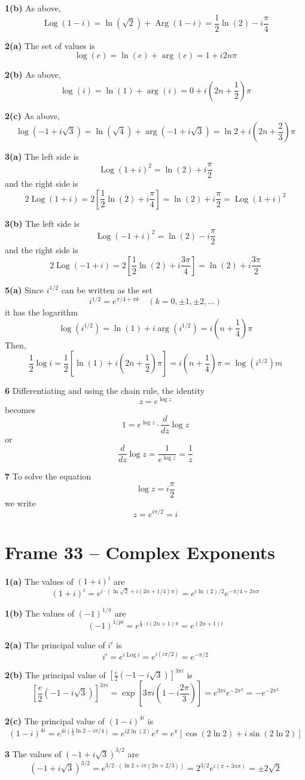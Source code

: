 \documentclass{article}
\DeclareMathOperator{\Log}{Log}
\DeclareMathOperator{\Arg}{Arg}
\begin{document}
\textbf{1(b)}
As above,
\[
	\Log(1 - i) = \ln(\sqrt{2}) + \Arg(1 - i)
	= \frac{1}{2}\ln(2) - i\frac{\pi}{4}
\]

\textbf{2(a)}
The set of values is
\[
	\log(e) = \ln(e) + \arg(e) 
	= 1 + i2n\pi
\]

\textbf{2(b)}
As above,
\[
	\log(i) = \ln(1) + \arg(i)
	= 0 + i\left(2n + \frac{1}{2}\right) \pi
\]

\textbf{2(c)}
As above,
\[
	\log(-1 + i\sqrt{3}) = \ln(\sqrt{4}) + \arg(-1 + i\sqrt{3})
	= \ln 2 + i\left(2n + \frac{2}{3}\right) \pi
\]

\textbf{3(a)}
The left side is
\[
	\Log(1 + i)^2 = \ln(2) + i \frac{\pi}{2}
\]
and the right side is
\[
	2\Log(1 + i) = 2 \left[ \frac{1}{2} \ln(2) + i\frac{\pi}{4} \right]
	= \ln(2) + i\frac{\pi}{2}
	= \Log(1 + i)^2
\]

\textbf{3(b)}
The left side is
\[
	\Log(-1 + i)^2 = \ln(2) - i \frac{\pi}{2}
\]
and the right side is
\[
	2 \Log(-1 + i) = 2 \left[ \frac{1}{2} \ln(2) + i\frac{3\pi}{4} \right]
	= \ln(2) + i\frac{3\pi}{2}
\]

\textbf{5(a)}
Since $i^{1/2}$ can be written as the set
\[
	i^{1/2} = e^{\pi/4 + \pi k}		\quad (k = 0, \pm 1, \pm 2, \dots)
\]
it has the logarithm
\[
	\log(i^{1/2}) = \ln(1) + i \arg(i^{1/2})
	= i \left( n + \frac{1}{4} \right) \pi
\]
Then,
\[
	\frac{1}{2} \log i
	= \frac{1}{2} \left[ \ln(1) + i\left(2n + \frac{1}{2}\right)\pi \right]
	= i\left( n + \frac{1}{4} \right) \pi
	= \log(i^{1/2})m
\]

\textbf{6}
Differentiating and using the chain rule, the identity
\[
	z = e^{\log z}
\]
becomes
\[
	1 = e^{\log z} \cdot \frac{d}{dz} \log z
\]
or
\[
	\frac{d}{dz} \log z = \frac{1}{e^{\log z}} = \frac{1}{z}
\]

\textbf{7}
To solve the equation
\[
	\log z = i\frac{\pi}{2}
\]
we write
\[
	z = e^{i \pi/2} = i
\]


\clearpage
\section{Frame 33 -- Complex Exponents}
\textbf{1(a)}
The values of $(1 + i)^i$ are
\[
	(1 + i)^i
	= e^{i \cdot (\ln \sqrt{2} + i(2n + 1/4)\pi)}
	= e^{i \ln (2) / 2} e^{-\pi/4 + 2n\pi}
\]

\textbf{1(b)}
The values of $(-1)^{1/\pi}$ are
\[
	(-1)^{1/pi}
	= e^{\frac{1}{\pi} \cdot i(2n + 1)\pi}
	= e^{(2n + 1)i}
\]

\textbf{2(a)}
The principal value of $i^i$ is
\[
	i^i
	= e^{i \Log i}
	= e^{i (i \pi/2)}
	= e^{-\pi / 2}
\]

\textbf{2(b)}
The principal value of $[\frac{e}{2}(-1 - i\sqrt{3})]^{3\pi i}$ is
\[
	[\frac{e}{2}(-1 - i\sqrt{3})]^{3\pi i}
	= \exp\left[3\pi i \left( 1 - i\frac{2\pi}{3}\right) \right]
	= e^{3\pi i} e^{-2\pi^2}
	= -e^{-2\pi^2}
\]

\textbf{2(c)}
The principal value of $(1 - i)^{4i}$ is
\[
	(1 - i)^{4i}
	= e^{4i (\frac{1}{2} \ln 2 - i\pi/4)}
	= e^{i 2\ln(2)} e^{\pi}
	= e^{\pi} [\cos(2\ln2) + i\sin(2\ln2)]
\]

\textbf{3}
The values of $(-1 + i\sqrt{3})^{3/2}$ are
\[
	(-1 + i\sqrt{3})^{3/2}
	= e^{3/2 \cdot (\ln 2 + i \pi(2n + 2/3))}
	= 2^{3/2} e^{i (\pi + 3n\pi)}
	= \pm 2\sqrt{2}
\]
\end{document}
